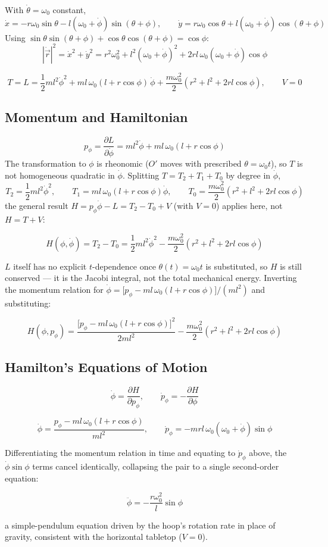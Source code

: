 \documentclass[11pt]{article}
\begin{document}
With $\dot\theta=\omega_0$ constant,
\[
    \dot x = -r\omega_0\sin\theta - l(\omega_0+\dot\phi)\sin(\theta+\phi),
    \qquad
    \dot y = r\omega_0\cos\theta + l(\omega_0+\dot\phi)\cos(\theta+\phi)
\]
Using $\sin\theta\sin(\theta+\phi)+\cos\theta\cos(\theta+\phi)=\cos\phi$:
\[
    |\dot{\vec r}|^2 = \dot x^2+\dot y^2 = r^2\omega_0^2 + l^2(\omega_0+\dot\phi)^2 + 2rl\,\omega_0(\omega_0+\dot\phi)\cos\phi
\]
\begin{result}
\[
    T = L = \frac12 ml^2\dot\phi^2 + ml\,\omega_0(l+r\cos\phi)\,\dot\phi + \frac{m\omega_0^2}{2}\left(r^2+l^2+2rl\cos\phi\right), \qquad V=0
\]
\end{result}

\subsection*{Momentum and Hamiltonian}

\[
    p_\phi = \frac{\partial L}{\partial\dot\phi} = ml^2\dot\phi + ml\,\omega_0(l+r\cos\phi)
\]
The transformation to $\phi$ is rheonomic ($O'$ moves with prescribed $\theta=\omega_0t$), so $T$ is not homogeneous quadratic in $\dot\phi$. Splitting $T=T_2+T_1+T_0$ by degree in $\dot\phi$,
\[
    T_2 = \frac12ml^2\dot\phi^2, \qquad T_1 = ml\,\omega_0(l+r\cos\phi)\dot\phi, \qquad T_0 = \frac{m\omega_0^2}{2}\left(r^2+l^2+2rl\cos\phi\right)
\]
the general result $H=p_\phi\dot\phi-L=T_2-T_0+V$ (with $V=0$) applies here, not $H=T+V$:
\begin{result}
\[
    H(\phi,\dot\phi) = T_2-T_0 = \frac12 ml^2\dot\phi^2 - \frac{m\omega_0^2}{2}\left(r^2+l^2+2rl\cos\phi\right)
\]
\end{result}
$L$ itself has no explicit $t$-dependence once $\theta(t)=\omega_0t$ is substituted, so $H$ is still conserved --- it is the Jacobi integral, not the total mechanical energy.
Inverting the momentum relation for $\dot\phi = \big[p_\phi-ml\,\omega_0(l+r\cos\phi)\big]/(ml^2)$ and substituting:
\begin{result}
\[
    H(\phi,p_\phi) = \frac{\big[p_\phi-ml\,\omega_0(l+r\cos\phi)\big]^2}{2ml^2} - \frac{m\omega_0^2}{2}\left(r^2+l^2+2rl\cos\phi\right)
\]
\end{result}

\subsection*{Hamilton's Equations of Motion}

\[
    \dot\phi = \frac{\partial H}{\partial p_\phi}, \qquad \dot p_\phi = -\frac{\partial H}{\partial\phi}
\]
\begin{result}
\[
    \dot\phi = \frac{p_\phi-ml\,\omega_0(l+r\cos\phi)}{ml^2}, \qquad \dot p_\phi = -mrl\,\omega_0(\omega_0+\dot\phi)\sin\phi
\]
\end{result}
Differentiating the momentum relation in time and equating to $\dot p_\phi$ above, the $\dot\phi\sin\phi$ terms cancel identically, collapsing the pair to a single second-order equation:
\begin{result}
\[
    \ddot\phi = -\frac{r\omega_0^2}{l}\sin\phi
\]
\end{result}
a simple-pendulum equation driven by the hoop's rotation rate in place of gravity, consistent with the horizontal tabletop ($V=0$).
\end{document}
